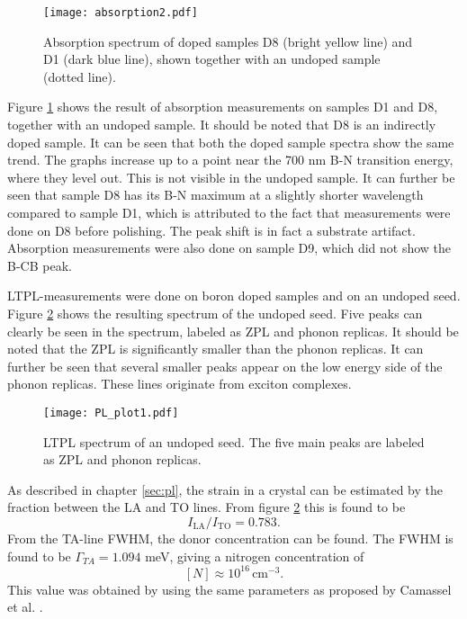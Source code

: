 \begin{figure}[h]
\begin{center}
\texttt{[image: absorption2.pdf]}
\caption{Absorption spectrum of doped samples D8 (bright yellow line) and D1 (dark blue line), shown together with an undoped sample (dotted line). 
\label{fig:abs2}}
\end{center}
\end{figure}

Figure \ref{fig:abs2} shows the result of absorption measurements on samples D1 and D8, together with an undoped sample. It should be noted that D8 is an indirectly doped sample. It can be seen that both the doped sample spectra show the same trend. The graphs increase up to a point near the 700 nm B-N transition energy, where they level out. This is not visible in the undoped sample. It can further be seen that sample D8 has its B-N maximum at a slightly shorter wavelength compared to sample D1, which is attributed to the fact that measurements were done on D8 before polishing. The peak shift is in fact a substrate artifact. Absorption measurements were also done on sample D9, which did not show the B-CB peak. 



LTPL-measurements were done on boron doped samples and on an undoped seed. Figure \ref{fig:pl_spectrum1} shows the resulting spectrum of the undoped seed. Five peaks can clearly be seen in the spectrum, labeled as ZPL and phonon replicas. It should be noted that the ZPL is significantly smaller than the phonon replicas. It can further be seen that several smaller peaks appear on the low energy side of the phonon replicas. These lines originate from exciton complexes.  

\begin{figure}[h]
\begin{center}
\texttt{[image: PL\_plot1.pdf]}
\caption{LTPL spectrum of an undoped seed. The five main peaks are labeled as ZPL and phonon replicas. 
\label{fig:pl_spectrum1}}
\end{center}
\end{figure}

As described in chapter \ref{sec:pl}, the strain in a crystal can be estimated by the fraction between the LA and TO lines. From figure \ref{fig:pl_spectrum1} this is found to be 
\[I_\mathrm{LA}/I_\mathrm{TO} = 0.783.\]
From the TA-line FWHM, the donor concentration can be found. The FWHM is found to be $\Gamma_{TA} = 1.094$ meV, giving a nitrogen concentration of 
\[[N] \approx 10^{16} \, \mathrm{cm^{-3}}.\]
This value was obtained by using the same parameters as proposed by Camassel et al. \cite{Camassel2006}. 

